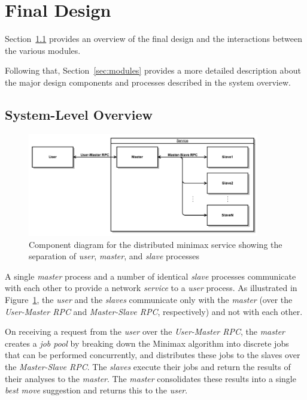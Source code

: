 \documentclass[pdftex,12pt,a4paper]{article}
\begin{document}
\section{Final Design}

Section~\ref{sec:system} provides an overview of the final design and the interactions between the various modules.

Following that, Section~\ref{sec:modules} provides a more detailed description about the major design components and processes described in the system overview.

%
%
\subsection{System-Level Overview}\label{sec:system}

\begin{figure}[h]
\begin{center}
\includegraphics[width=0.9\textwidth]{img/component-diagram}
\caption{Component diagram for the distributed minimax service showing the separation of \emph{user}, \emph{master}, and \emph{slave} processes}
\label{fig:component-diagram}
\end{center}
\end{figure}

A single \emph{master} process and a number of identical \emph{slave} processes communicate with each other to provide a network \emph{service} to a \emph{user} process. As illustrated in Figure~\ref{fig:component-diagram}, the \emph{user} and the \emph{slaves} communicate only with the \emph{master} (over the \emph{User-Master RPC} and \emph{Master-Slave RPC}, respectively) and not with each other.

On receiving a request from the \emph{user} over the \emph{User-Master RPC}, the \emph{master} creates a \emph{job pool} by breaking down the Minimax algorithm into discrete jobs that can be performed concurrently, and distributes these jobs to the slaves over the \emph{Master-Slave RPC}. The \emph{slaves} execute their jobs and return the results of their analyses to the \emph{master}. The \emph{master} consolidates these results into a single \emph{best move} suggestion and returns this to the \emph{user}.
\end{document}
